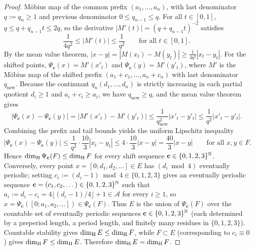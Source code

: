 \begin{proof}
M\"obius map of the common prefix $(a_1,\dots,a_n)$, with last denominator
$q:=q_n\ge1$ and previous denominator $0\le q_{n-1}\le q$. For all $t\in[0,1]$,
$q\le q+q_{n-1}t\le 2q$, so the derivative $|M'(t)|=(q+q_{n-1}t)^{-2}$ satisfies
\[
\frac{1}{4q^2}\le |M'(t)|\le\frac{1}{q^2}\qquad\text{for all }t\in[0,1].
\]
By the mean value theorem, $|x-y|=|M(x_t)-M(y_t)|\ge\frac{1}{4q^2}|x_t-y_t|$.
For the shifted points, $\Psi_{\mathbf c}(x)=M'(x'_t)$ and
$\Psi_{\mathbf c}(y)=M'(y'_t)$, where $M'$ is the M\"obius map of the shifted
prefix $(a_1+c_1,\dots,a_n+c_n)$ with last denominator $q_{\mathrm{new}}$.
Because the continuant $q_n(d_1,\dots,d_n)$ is strictly increasing in each
partial quotient $d_i\ge1$ and $a_i+c_i\ge a_i$, we have
$q_{\mathrm{new}}\ge q$, and the mean value theorem gives
\[
\bigl|\Psi_{\mathbf c}(x)-\Psi_{\mathbf c}(y)\bigr|
=\bigl|M'(x'_t)-M'(y'_t)\bigr|
\le\frac{1}{q_{\mathrm{new}}^2}|x'_t-y'_t|
\le\frac{1}{q^2}|x'_t-y'_t|.
\]
Combining the prefix and tail bounds yields the uniform Lipschitz inequality
\[
\bigl|\Psi_{\mathbf c}(x)-\Psi_{\mathbf c}(y)\bigr|
\le\frac{1}{q^2}\cdot\frac{10}{3}|x_t-y_t|
\le 4\cdot\frac{10}{3}|x-y|=\frac{40}{3}|x-y|\qquad\text{for all }x,y\in F.
\]
Hence $\dim_{\mathrm{H}}\Psi_{\mathbf c}(F)\le\dim_{\mathrm{H}} F$ for every shift sequence
$\mathbf c\in\{0,1,2,3\}^{\mathbb{N}}$. Conversely, every point
$x=[0;d_1,d_2,\ldots]\in E$ has $(d_i\bmod4)$ eventually periodic; setting
$c_i:=(d_i-1)\bmod4\in\{0,1,2,3\}$ gives an eventually periodic sequence
$\mathbf c=(c_1,c_2,\dots)\in\{0,1,2,3\}^{\mathbb{N}}$ such that
$a_i:=d_i-c_i=4\lfloor(d_i-1)/4\rfloor+1\in\mathcal A$ for every $i\ge1$, so
$x=\Psi_{\mathbf c}([0;a_1,a_2,\dots])\in\Psi_{\mathbf c}(F)$. Thus $E$ is the
union of $\Psi_{\mathbf c}(F)$ over the countable set of eventually periodic
sequences $\mathbf c\in\{0,1,2,3\}^{\mathbb{N}}$ (each determined by a preperiod length,
a period length, and finitely many residues in $\{0,1,2,3\}$). Countable
stability gives $\dim_{\mathrm{H}} E\le\dim_{\mathrm{H}} F$, while $F\subset E$ (corresponding to
$c_i\equiv0$) gives $\dim_{\mathrm{H}} F\le\dim_{\mathrm{H}} E$. Therefore $\dim_{\mathrm{H}} E=\dim_{\mathrm{H}} F$.


\end{proof}
